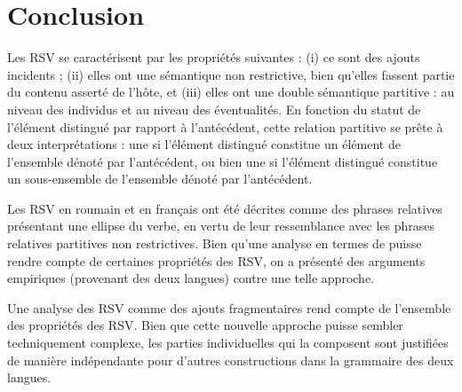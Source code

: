\clearpage   
\section{Conclusion}\label{ch3:sect3.6}

Les RSV se caractérisent par les propriétés suivantes : (i) ce sont des ajouts incidents ; (ii) elles ont une sémantique non restrictive, bien qu’elles fassent partie du contenu asserté de l’hôte, et (iii) elles ont une double sémantique partitive : au niveau des individus et au niveau des éventualités. En fonction du statut de l’élément distingué par rapport à l’antécédent, cette relation partitive se prête à deux interprétations : une  si l’élément distingué constitue un élément de l’ensemble dénoté par l’antécédent, ou bien une  si l’élément distingué constitue un sous-ensemble de l’ensemble dénoté par l’antécédent. 


Les RSV en roumain et en français ont été décrites comme des phrases relatives présentant une ellipse du verbe, en vertu de leur ressemblance avec les phrases relatives partitives non restrictives. Bien qu’une analyse en termes de  puisse rendre compte de certaines propriétés des RSV, on a présenté des arguments empiriques (provenant des deux langues) contre une telle approche. 


Une analyse des RSV comme des ajouts fragmentaires rend compte de l’ensemble des propriétés des RSV. Bien que cette nouvelle approche puisse sembler techniquement complexe, les parties individuelles qui la composent sont justifiées de manière indépendante pour d’autres constructions dans la grammaire des deux langues.  